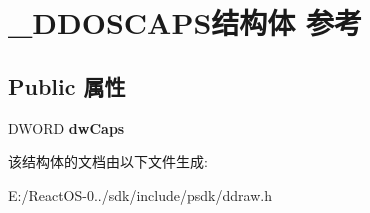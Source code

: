 \hypertarget{struct___d_d_o_s_c_a_p_s}{}\section{\+\_\+\+D\+D\+O\+S\+C\+A\+P\+S结构体 参考}
\label{struct___d_d_o_s_c_a_p_s}
\subsection*{Public 属性}
\begin{DoxyCompactItemize}
\item 
\mbox{\label{struct___d_d_o_s_c_a_p_s_adb5b80f6bda6465c26ea9a5bc03d5122}} 
D\+W\+O\+RD {\bfseries dw\+Caps}
\end{DoxyCompactItemize}


该结构体的文档由以下文件生成\+:\begin{DoxyCompactItemize}
\item 
E\+:/\+React\+O\+S-\/0../sdk/include/psdk/ddraw.\+h\end{DoxyCompactItemize}
